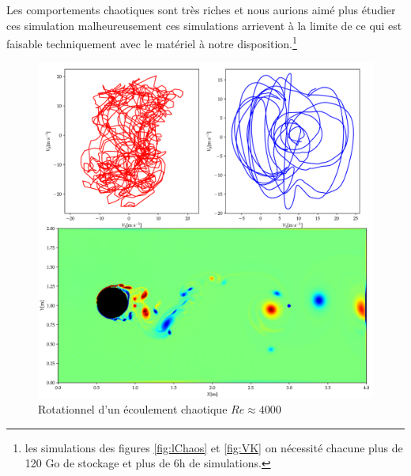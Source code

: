 Les comportements chaotiques sont très riches et nous aurions aimé plus étudier ces simulation malheureusement ces simulations arrievent à la limite de ce qui est faisable techniquement avec le matériel à notre disposition.\footnote{les simulations des figures \ref{fig:lChaos} et \ref{fig:VK} on nécessité chacune plus de 120 Go de stockage et plus de 6h de simulations.}
\begin{figure}[hbtp]
  \centering
  \includegraphics[width=\linewidth]{Fig/chaos.pdf}
  \caption{Rotationnel d'un écoulement chaotique $Re \approx 4000$}
  \label{fig:Chaos}
\end{figure}